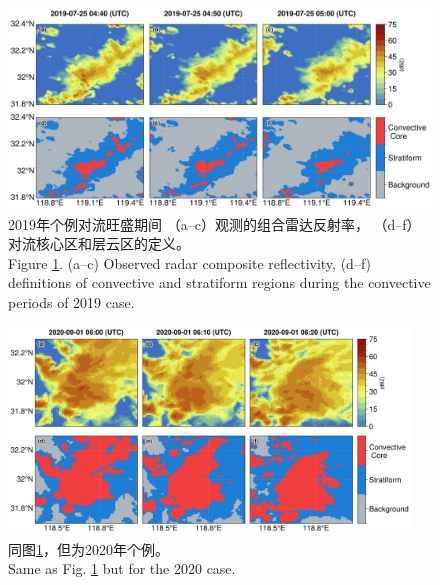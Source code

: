 \begin{figure}[H]
\centering
\includegraphics[width=\textwidth]{./figures/china_classification_2019.png}
\caption{
2019年个例对流旺盛期间
（a--c）观测的组合雷达反射率，
（d--f）对流核心区和层云区的定义。\\
Figure \ref{fig:china_classification_2019}.
(a--c) Observed radar composite reflectivity,
(d--f) definitions of convective and stratiform regions during the convective periods of 2019 case.
}
\label{fig:china_classification_2019}
\end{figure}

\begin{figure}[H]
\centering
\includegraphics[width=0.95\textwidth]{./figures/china_classification_2020.png}
\caption{
同图\ref{fig:china_classification_2019}，但为2020年个例。\\
Same as Fig. \ref{fig:china_classification_2019} but for the 2020 case.
}
\label{fig:china_classification_2020}
\end{figure}

